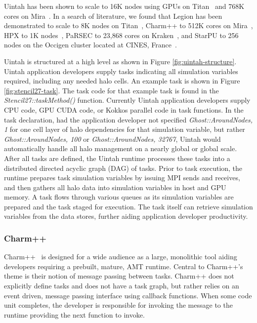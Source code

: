 \documentclass[12pt]{article}
\begin{document}
Uintah has been shown to scale to 16K nodes using GPUs on Titan~\cite{uintah-2016-titan-scaling} and 768K cores on Mira~\cite{uintah-2016-mira-scaling}.   In a search of literature, we found that Legion has been demonstrated to scale to 8K nodes on Titan~\cite{legion-2014-thesis-scaling}, Charm++ to 512K cores on Mira~\cite{charmpp-2017-scaling}, HPX to 1K nodes~\cite{HPX-scaling-global-address-space}, PaRSEC to 23,868 cores on Kraken~\cite{parsec-2014-scaling}, and StarPU to 256 nodes on the Occigen cluster located at CINES, France~\cite{starpu-2016-scaling}. 


Uintah is structured at a high level as shown in Figure \ref{fig:uintah-structure}. Uintah application developers supply tasks indicating all simulation variables required, including any needed halo cells.  An example task is shown in Figure \ref{fig:stencil27-task}.  The task code for that example task is found in the \emph{Stencil27::taskMethod()} function.  Currently Uintah application developers supply CPU code, GPU CUDA code, or Kokkos parallel code in task functions.  In the task declaration, had the application developer not specified \emph{Ghost::AroundNodes, 1} for one cell layer of halo dependencies for that simulation variable, but rather \emph{Ghost::AroundNodes, 100} or \emph{Ghost::AroundNodes, 32767}, Uintah would automatically handle all halo management on a nearly global or global scale.  After all tasks are defined, the Uintah runtime processes these tasks into a distributed directed acyclic graph (DAG) of tasks.  Prior to task execution, the runtime prepares task simulation variables by issuing MPI sends and receives, and then gathers all halo data into simulation variables in host and GPU memory.  A task flows through various queues as its simulation variables are prepared and the task staged for execution.  The task itself can retrieve simulation variables from the data stores, further aiding application developer productivity.





\subsubsection{Charm++}
\label{ch:charmpp}
Charm++~\cite{charmpp1993} is designed for a wide audience as a large, monolithic tool aiding developers requiring a prebuilt, mature, AMT runtime. Central to Charm++'s theme is their notion of message passing between tasks.  Charm++ does not explicitly define tasks and does not have a task graph, but rather relies on an event driven, message passing interface using callback functions.  When some code unit completes, the developer is responsible for invoking the message to the runtime providing the next function to invoke.  
\end{document}
